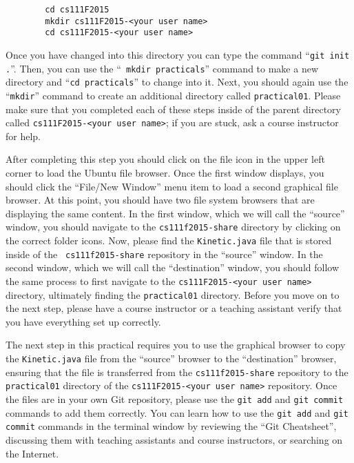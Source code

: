     \vspace*{-.1in}
    \begin{verbatim}
        cd cs111F2015
        mkdir cs111F2015-<your user name>
        cd cs111F2015-<your user name>
    \end{verbatim}
    \vspace*{-.1in}


Once you have changed into this directory you can type the command ``{\tt git init .}''. Then, you can use the ``{\tt
  mkdir practicals}'' command to make a new directory and ``{\tt cd practicals}'' to change into it.  Next, you
should again use the ``{\tt mkdir}'' command to create an additional directory called {\tt practical01}.  Please make
sure that you completed each of these steps inside of the parent directory called {\tt cs111F2015-<your user name>}; if
you are stuck, ask a course instructor for help.

After completing this step you should click on the file icon in the upper left corner to load the Ubuntu file browser.
Once the first window displays, you should click the ``File/New Window'' menu item to load a second graphical file
browser. At this point, you should have two file system browsers that are displaying the same content.  In the first
window, which we will call the ``source'' window, you should navigate to the {\tt cs111f2015-share} directory by
clicking on the correct folder icons.  Now, please find the {\tt Kinetic.java} file that is stored inside of the {\tt
  cs111f2015-share} repository in the ``source'' window. In the second window, which we will call the ``destination''
window, you should follow the same process to first navigate to the {\tt cs111F2015-<your user name>} directory,
ultimately finding the {\tt practical01} directory. Before you move on to the next step, please have a course instructor
or a teaching assistant verify that you have everything set up correctly.

The next step in this practical requires you to use the graphical browser to copy the {\tt Kinetic.java} file from the
``source'' browser to the ``destination'' browser, ensuring that the file is transferred from the {\tt cs111f2015-share}
repository to the {\tt practical01} directory of the {\tt cs111F2015-<your user name>} repository.  Once the files are
in your own Git repository, please use the {\tt git add} and {\tt git commit} commands to add them correctly. You can learn how to use the {\tt git add} and {\tt git commit} commands in the terminal window by reviewing the ``Git Cheatsheet'', discussing them with teaching assistants and course instructors, or searching on the Internet.


